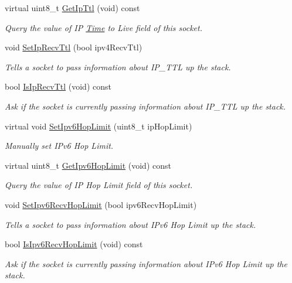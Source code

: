 \begin{DoxyCompactItemize}
virtual uint8\+\_\+t \hyperlink{classns3_1_1Socket_adf6420d12b8a0b6a20e46c37fe48830d}{Get\+Ip\+Ttl} (void) const 
\begin{DoxyCompactList}\small\item\em Query the value of IP \hyperlink{classns3_1_1Time}{Time} to Live field of this socket. \end{DoxyCompactList}\item 
void \hyperlink{classns3_1_1Socket_ae89b697f6188c791113afe23ccc23f12}{Set\+Ip\+Recv\+Ttl} (bool ipv4\+Recv\+Ttl)
\begin{DoxyCompactList}\small\item\em Tells a socket to pass information about I\+P\+\_\+\+T\+TL up the stack. \end{DoxyCompactList}\item 
bool \hyperlink{classns3_1_1Socket_abc87245c3eec89fc043d4f043b0be35f}{Is\+Ip\+Recv\+Ttl} (void) const 
\begin{DoxyCompactList}\small\item\em Ask if the socket is currently passing information about I\+P\+\_\+\+T\+TL up the stack. \end{DoxyCompactList}\item 
virtual void \hyperlink{classns3_1_1Socket_a6c5a87657bcdb7a296a59ea0798f46fa}{Set\+Ipv6\+Hop\+Limit} (uint8\+\_\+t ip\+Hop\+Limit)
\begin{DoxyCompactList}\small\item\em Manually set I\+Pv6 Hop Limit. \end{DoxyCompactList}\item 
virtual uint8\+\_\+t \hyperlink{classns3_1_1Socket_ad78033887757bda28f40f4ab1f0620d0}{Get\+Ipv6\+Hop\+Limit} (void) const 
\begin{DoxyCompactList}\small\item\em Query the value of IP Hop Limit field of this socket. \end{DoxyCompactList}\item 
void \hyperlink{classns3_1_1Socket_ae3d66f7a02aa78a59846d0b6e116fca2}{Set\+Ipv6\+Recv\+Hop\+Limit} (bool ipv6\+Recv\+Hop\+Limit)
\begin{DoxyCompactList}\small\item\em Tells a socket to pass information about I\+Pv6 Hop Limit up the stack. \end{DoxyCompactList}\item 
bool \hyperlink{classns3_1_1Socket_a99fb541eff485b5b2c6fa7f0aac3abb9}{Is\+Ipv6\+Recv\+Hop\+Limit} (void) const 
\begin{DoxyCompactList}\small\item\em Ask if the socket is currently passing information about I\+Pv6 Hop Limit up the stack. \end{DoxyCompactList}\item 

\end{DoxyCompactItemize}
